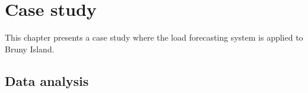 \chapter{Case study}
This chapter presents a case study where the load forecasting system is applied to Bruny Island.

\section{Data analysis}
